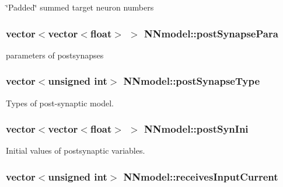 \char`\"{}\+Padded\char`\"{} summed target neuron numbers 

\hypertarget{classNNmodel_a3b9431104ee496ed084ab549ebf2de10}{
\subsubsection[{post\+Synapse\+Para}]{\setlength{\rightskip}{0pt plus 5cm}vector$<$vector$<$float$>$ $>$ N\+Nmodel\+::post\+Synapse\+Para}}\label{classNNmodel_a3b9431104ee496ed084ab549ebf2de10}


parameters of postsynapses 

\hypertarget{classNNmodel_a4fc23591415ddac76d1d92ab68c018c9}{
\subsubsection[{post\+Synapse\+Type}]{\setlength{\rightskip}{0pt plus 5cm}vector$<$unsigned int$>$ N\+Nmodel\+::post\+Synapse\+Type}}\label{classNNmodel_a4fc23591415ddac76d1d92ab68c018c9}


Types of post-\/synaptic model. 

\hypertarget{classNNmodel_a82827284185d5c39e4e04e14cf612253}{
\subsubsection[{post\+Syn\+Ini}]{\setlength{\rightskip}{0pt plus 5cm}vector$<$vector$<$float$>$ $>$ N\+Nmodel\+::post\+Syn\+Ini}}\label{classNNmodel_a82827284185d5c39e4e04e14cf612253}


Initial values of postsynaptic variables. 

\hypertarget{classNNmodel_acd0592315c59ac3c0e0dbe9bb35d7004}{
\subsubsection[{receives\+Input\+Current}]{\setlength{\rightskip}{0pt plus 5cm}vector$<$unsigned int$>$ N\+Nmodel\+::receives\+Input\+Current}}\label{classNNmodel_acd0592315c59ac3c0e0dbe9bb35d7004}


